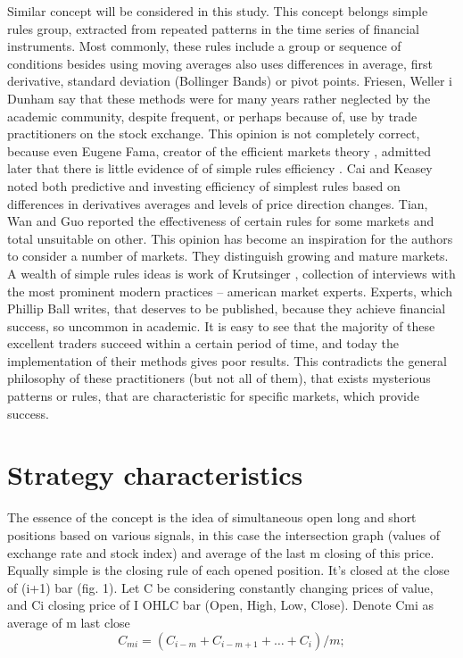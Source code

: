 \documentclass{tewiart}
\begin{document}
Similar concept will be considered in this study. This concept belongs simple rules group, extracted from repeated patterns in the time series of financial instruments. Most commonly, these rules include a group or sequence of conditions besides using moving averages also uses differences in average, first derivative, standard deviation (Bollinger Bands) or pivot points. Friesen, Weller i Dunham \cite{friesen09} say that these methods were for many years rather neglected by the academic community, despite frequent, or perhaps because of, use by trade practitioners on the stock exchange. This opinion is not completely correct, because even Eugene Fama, creator of the efficient markets theory \cite{fama91}, admitted later that  there is little evidence of of simple rules efficiency \cite{fama98}. Cai and Keasey \cite{cai05} noted both predictive and investing efficiency of simplest rules based on differences in derivatives averages and levels of price direction changes. Tian, Wan and Guo \cite{tian02} reported the effectiveness of certain rules for some markets and total unsuitable on other. This opinion has become an inspiration for the authors to consider a number of markets. They distinguish growing and mature markets. A wealth of simple rules ideas is work of Krutsinger \cite{krutsinger99}, collection of interviews with the most prominent modern practices – american market experts. Experts, which Phillip Ball \cite{ball07} writes, that deserves to be published, because they achieve financial success, so uncommon in academic.
It is easy to see that the majority of these excellent traders succeed within a certain period of time, and today the implementation of their methods gives poor results. This contradicts the general philosophy of these practitioners (but not all of them), that exists mysterious patterns or rules, that are characteristic for specific markets, which provide success.
\section{Strategy characteristics}
\indent The essence of the concept is the idea of simultaneous open long and short positions based on various signals, in this case the intersection graph (values of exchange rate  and stock index) and average of the last m closing of this price.\\
Equally simple is the closing rule of each opened position. It's closed at the close of (i+1) bar (fig. 1).
Let C be considering constantly changing prices of value, and Ci closing price of I OHLC bar (Open, High, Low, Close). Denote Cmi as average of m last close
\begin{equation} \label{label-of-equation-1}
  C_{mi} = (C_{i-m} + C_{i-m+1} + … + C_{i} ) / m; 
\end{equation}
\end{document}
